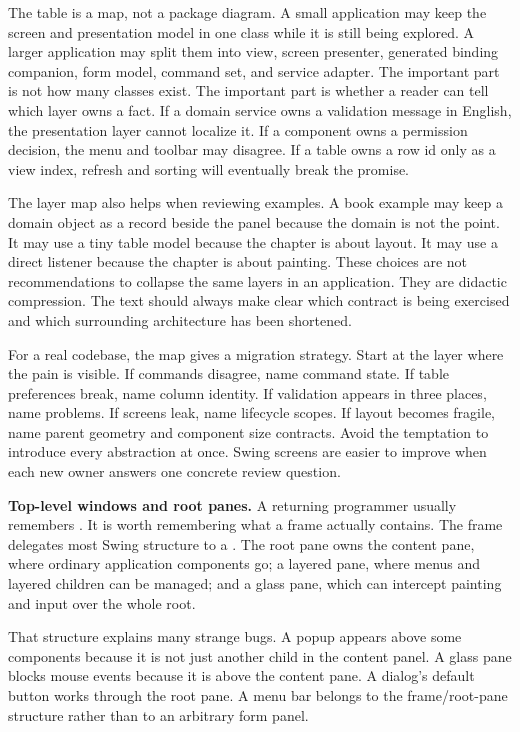 The table is a map, not a package diagram. A small application may keep the
screen and presentation model in one class while it is still being explored. A
larger application may split them into view, screen presenter, generated binding
companion, form model, command set, and service adapter. The important part is
not how many classes exist. The important part is whether a reader can tell
which layer owns a fact. If a domain service owns a validation message in
English, the presentation layer cannot localize it. If a component owns a
permission decision, the menu and toolbar may disagree. If a table owns a row id
only as a view index, refresh and sorting will eventually break the promise.

The layer map also helps when reviewing examples. A book example may keep a
domain object as a record beside the panel because the domain is not the point.
It may use a tiny table model because the chapter is about layout. It may use a
direct listener because the chapter is about painting. These choices are not
recommendations to collapse the same layers in an application. They are didactic
compression. The text should always make clear which contract is being
exercised and which surrounding architecture has been shortened.

For a real codebase, the map gives a migration strategy. Start at the layer
where the pain is visible. If commands disagree, name command state. If table
preferences break, name column identity. If validation appears in three places,
name problems. If screens leak, name lifecycle scopes. If layout becomes
fragile, name parent geometry and component size contracts. Avoid the temptation
to introduce every abstraction at once. Swing screens are easier to improve
when each new owner answers one concrete review question.

\textbf{Top-level windows and root panes.} A returning programmer usually remembers . It is worth remembering what a frame actually contains. The frame delegates most Swing structure to a . The root pane owns the content pane, where ordinary application components go; a layered pane, where menus and layered children can be managed; and a glass pane, which can intercept painting and input over the whole root.

That structure explains many strange bugs. A popup appears above some components because it is not just another child in the content panel. A glass pane blocks mouse events because it is above the content pane. A dialog's default button works through the root pane. A menu bar belongs to the frame/root-pane structure rather than to an arbitrary form panel.

